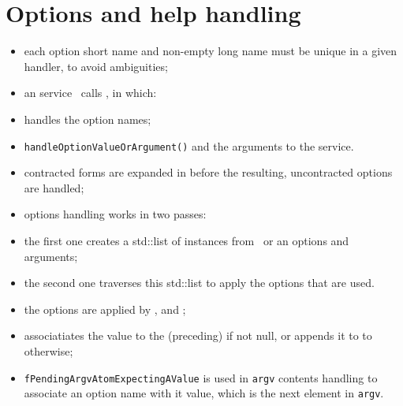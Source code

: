 \section{Options and help handling}

\begin{itemize}
\item each option short name and non-empty long name must be unique in a given handler,
    to avoid ambiguities;

\item an service \mainFunction\ calls , in which:
  \item {} handles the option names;
  \item {\tt handleOptionValueOrArgument()}%
      and the arguments to the service.

\item contracted forms are expanded in  before the resulting,
    uncontracted options are handled;

\item options handling works in two passes:
    \item the first one creates a std::list of  instances from
        \argcargv\ or an options and arguments;
    \item the second one traverses this std::list to apply the options that are used.

\item the options are applied by ,  and
    ;

\item {} associatiates the value
    to the (preceding)  if not null,
    or appends it to  to otherwise;

\item {\tt fPendingArgvAtomExpectingAValue} is used in {\tt argv} contents handling
    to associate an option name with it value, which is the next element in {\tt argv}.

\end{itemize}


